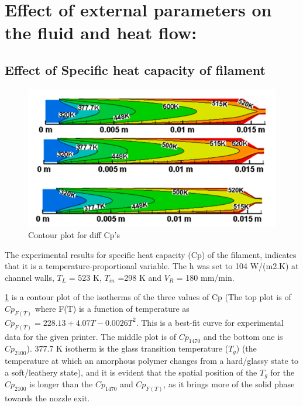 \documentclass{report}
\begin{document}
{\section{Effect of external parameters on the fluid and heat flow:}
\subsection{Effect of Specific heat capacity of filament}

\begin{figure}
    \includegraphics[width=1\linewidth]{T vs r contour.png}
    \caption{Contour plot for diff Cp's}
    \label{fig:Contour plot for diff Cp}
\end{figure}

The experimental results for specific heat capacity (Cp) of the filament, indicates that it is a temperature-proportional variable. The h was set to 104 W/(m2.K) at channel walls, $T_L$ = 523 K, $T_{in}$ =298 K and $V_R$ = 180 mm/min. 

\ref{fig:Contour plot for diff Cp} is a contour plot of the isotherms of the three values of Cp (The top plot is of $Cp_{F(T)}$ where F(T) is a function of temperature as $Cp_{F(T)} = 228.13 + 4.07T - 0.0026T^2$. This is a best-fit curve for experimental data for the given printer. The middle plot is of $Cp_{1470}$ and the bottom one is $Cp_{2100}$). 377.7 K isotherm is the glass transition temperature ($T_g$) (the temperature at which an amorphous polymer changes from a hard/glassy state to a soft/leathery state), and it is evident that the spatial position of the $T_g$ for the $Cp_{2100}$ is longer than the $Cp_{1470}$ and $Cp_{F(T)}$, as it brings more of the solid phase towards the nozzle exit.

}
\end{document}
